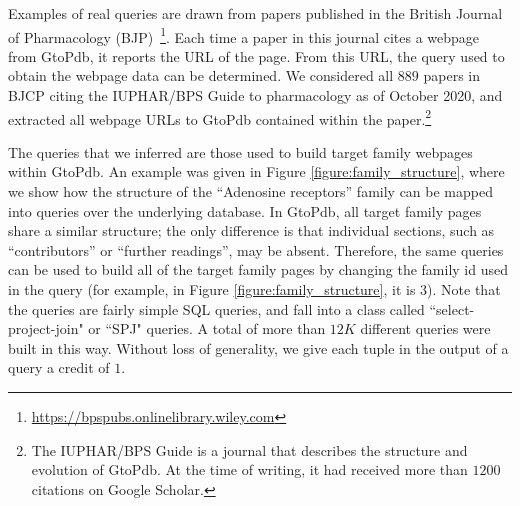 

Examples of real queries are drawn from papers published in the British Journal of Pharmacology (BJP)~\footnote{\url{https://bpspubs.onlinelibrary.wiley.com}}.  Each time a paper in this journal cites a webpage from GtoPdb, it reports the URL of the page. From this URL, the query used to obtain the webpage data can be determined. 
We considered all $889$ papers in BJCP citing the IUPHAR/BPS Guide to pharmacology \citep{iuphar2018} as of October 2020, and extracted all webpage URLs to GtoPdb contained within the paper.\footnote{The IUPHAR/BPS Guide is a journal that describes the structure and evolution of GtoPdb. At the time of writing, it had received more than $1200$ citations on Google Scholar.}

The queries that we inferred are those used to build target family webpages within GtoPdb.
An example was given in Figure \ref{figure:family_structure}, where we show how the structure of the ``Adenosine receptors'' family can be mapped into  queries over the underlying database. %
In GtoPdb, all target family pages share a similar structure; the only difference is that individual sections, such as ``contributors'' or ``further readings'', may be absent.
Therefore, the same queries can be used to build all of the target family pages by changing the family id used in the query (for example, in Figure \ref{figure:family_structure}, it is 3).
Note that the queries are fairly simple SQL queries, and fall into a class called ``select-project-join" or ``SPJ" queries. 
A total of more than $12K$ different queries were built in this way.
Without loss of generality, we give each tuple in the output of a query a credit of $1$.

